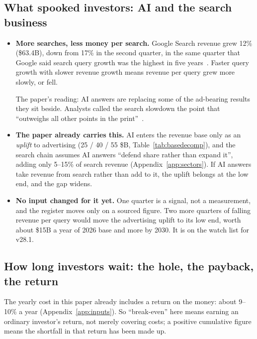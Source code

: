 \documentclass[11pt,letterpaper]{article}
\begin{document}
\subsection*{What spooked investors: AI and the search business}\label{ag:search}
\begin{itemize}
\item \textbf{More searches, less money per search.} Google Search revenue grew 12\% (\$63.4B), down from 17\% in the second quarter, in the same quarter that Google said search query growth was the highest in five years~\cite{ref:alphabet_q3_2026,ref:yahoo_nasdaq_1029}. Faster query growth with slower revenue growth means revenue per query grew more slowly, or fell.

  The paper's reading: AI answers are replacing some of the ad-bearing results they sit beside. Analysts called the search slowdown the point that ``outweighs all other points in the print''~\cite{ref:yahoo_nasdaq_1029}.
\item \textbf{The paper already carries this.} AI enters the revenue base only as an \emph{uplift} to advertising (25 / 40 / 55 \$B, Table~\ref{tab:basedecomp}), and the search chain assumes AI answers ``defend share rather than expand it'', adding only 5--15\% of search revenue (Appendix~\ref{app:sectors}). If AI answers take revenue from search rather than add to it, the uplift belongs at the low end, and the gap widens.
\item \textbf{No input changed for it yet.} One quarter is a signal, not a measurement, and the register moves only on a sourced figure. Two more quarters of falling revenue per query would move the advertising uplift to its low end, worth about \$15B a year of 2026 base and more by 2030. It is on the watch list for v28.1.
\end{itemize}

\subsection*{How long investors wait: the hole, the payback, the return}\label{ag:cum}
The yearly cost in this paper already includes a return on the money: about 9--10\% a year (Appendix~\ref{app:inputs}). So ``break-even'' here means earning an ordinary investor's return, not merely covering costs; a positive cumulative figure means the shortfall in that return has been made up.
\end{document}
